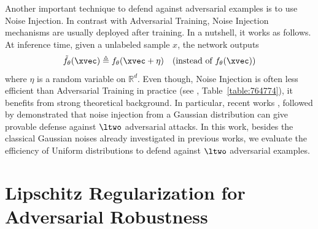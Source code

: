 Another important technique to defend against adversarial examples is to use Noise Injection. 
In contrast with Adversarial Training, Noise Injection mechanisms are usually deployed after training.
In a nutshell, it works as follows.
At inference time, given a unlabeled sample $x$, the network outputs
\begin{equation}
  \tilde{f}_\theta(\xvec) \triangleq f_\theta(\xvec + \eta) \ \ \ (\text{instead of  } f_\theta(\xvec)) 
\end{equation}
where $\eta$ is a random variable on $\mathbb{R}^d$.
Even though, Noise Injection is often less efficient than Adversarial Training in practice (see \eg, Table~\ref{table:764774}), it benefits from strong theoretical background.
In particular, recent works \cite{lecuyer2018certified,li2019certified}, followed by \cite{cohen2019certified,pinot2019theoretical} demonstrated that noise injection from a Gaussian distribution can give provable defense against $\ltwo$ adversarial attacks.
In this work, besides the classical Gaussian noises already investigated in previous works, we evaluate the efficiency of Uniform distributions to defend against $\ltwo$ adversarial examples. 



\section{Lipschitz Regularization for Adversarial Robustness}
\label{section:ch6-experiments}

